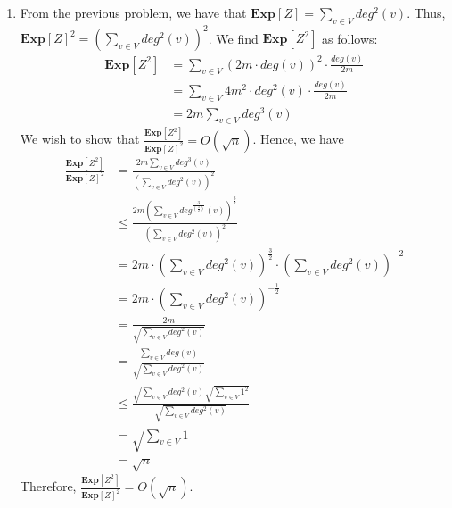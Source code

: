 \documentclass[12pt]{article}
\begin{document}
\begin{solution}
\begin{enumerate}[label=(\alph*)]
     \item From the previous problem, we have that $\textbf{Exp}[Z] = \sum\limits_{v \in V} deg^2(v)$. Thus, $\textbf{Exp}[Z]^2 = \left(\sum\limits_{v \in V}deg^2(v)\right)^2$. We find $\textbf{Exp}[Z^2]$ as follows:
    \begin{align*}
        \textbf{Exp}[Z^2] &= \sum\limits_{v \in V} \left(2m \cdot deg(v)\right)^2 \cdot \frac{deg(v)}{2m} \\
        &= \sum\limits_{v \in V} 4m^2 \cdot deg^2(v) \cdot \frac{deg(v)}{2m} \\
        &= 2m \sum\limits_{v \in V} deg^3(v)
    \end{align*}
    We wish to show that $\frac{\textbf{Exp}[Z^2]}{\textbf{Exp}[Z]^2} = O(\sqrt{n})$. Hence, we have
    \begin{align*}
        \frac{\textbf{Exp}[Z^2]}{\textbf{Exp}[Z]^2} &= \frac{2m\sum\limits_{v \in V} deg^3(v)}{\left(\sum\limits_{v \in V}deg^2(v)\right)^2} \\
        &\leq \frac{2m \left(\sum\limits_{v \in V}deg^{\frac{3}{\left(\frac{3}{2}\right)}}(v)\right)^{\frac{3}{2}}}{\left(\sum\limits_{v \in V}deg^2(v)\right)^2} \\
        &= 2m \cdot \left(\sum\limits_{v \in V}deg^2(v)\right)^\frac{3}{2} \cdot \left(\sum\limits_{v \in V}deg^2(v)\right)^{-2} \\
        &= 2m \cdot \left(\sum\limits_{v \in V}deg^2(v)\right)^{-\frac{1}{2}} \\
        &= \frac{2m}{\sqrt{\sum\limits_{v \in V} deg^2(v)}} \\
        &= \frac{\sum\limits_{v \in V}deg(v)}{\sqrt{\sum\limits_{v \in V}deg^2(v)}} \\
        &\leq \frac{\sqrt{\sum\limits_{v \in V} deg^2(v)} \sqrt{\sum\limits_{v \in V} 1^2}}{\sqrt{\sum\limits_{v \in V}deg^2(v)}} \\
        &= \sqrt{\sum\limits_{v \in V} 1} \\
        &= \sqrt{n}
    \end{align*}
    Therefore, $\frac{\textbf{Exp}[Z^2]}{\textbf{Exp}[Z]^2} = O(\sqrt{n})$.
\end{enumerate}


\end{solution}
\end{document}
